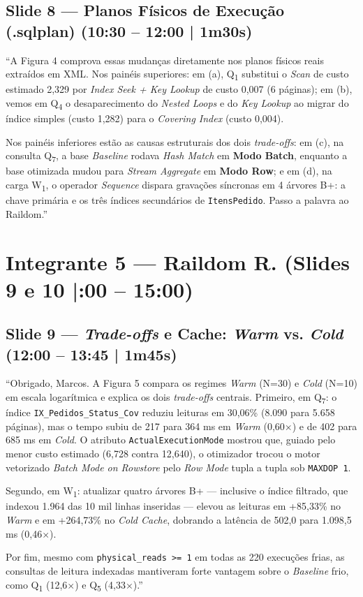 \documentclass[10pt,a4paper]{article}
\begin{document}
\subsection{Slide 8 — Planos Físicos de Execução (.sqlplan) (10:30 – 12:00 | 1m30s)}
\begin{fala}
``A Figura 4 comprova essas mudanças diretamente nos planos físicos reais extraídos em XML. Nos painéis superiores: em (a), Q\textsubscript{1} substitui o \textit{Scan} de custo estimado 2,329 por \textit{Index Seek + Key Lookup} de custo 0,007 (6 páginas); em (b), vemos em Q\textsubscript{4} o desaparecimento do \textit{Nested Loops} e do \textit{Key Lookup} ao migrar do índice simples (custo 1,282) para o \textit{Covering Index} (custo 0,004).

Nos painéis inferiores estão as causas estruturais dos dois \textit{trade-offs}: em (c), na consulta Q\textsubscript{7}, a base \textit{Baseline} rodava \textit{Hash Match} em \textbf{Modo Batch}, enquanto a base otimizada mudou para \textit{Stream Aggregate} em \textbf{Modo Row}; e em (d), na carga W\textsubscript{1}, o operador \textit{Sequence} dispara gravações síncronas em 4 árvores B+: a chave primária e os três índices secundários de \texttt{ItensPedido}. Passo a palavra ao Raildom.''
\end{fala}

\section{Integrante 5 — Raildom R. (Slides 9 e 10 \enspace|:00 – 15:00)}

\subsection{Slide 9 — \textit{Trade-offs} e Cache: \textit{Warm} vs. \textit{Cold} (12:00 – 13:45 | 1m45s)}
\begin{fala}
``Obrigado, Marcos. A Figura 5 compara os regimes \textit{Warm} (N=30) e \textit{Cold} (N=10) em escala logarítmica e explica os dois \textit{trade-offs} centrais. Primeiro, em Q\textsubscript{7}: o índice \texttt{IX\_Pedidos\_Status\_Cov} reduziu leituras em 30,06\% (8.090 para 5.658 páginas), mas o tempo subiu de 217 para 364 ms em \textit{Warm} (0,60$\times$) e de 402 para 685 ms em \textit{Cold}. O atributo \texttt{ActualExecutionMode} mostrou que, guiado pelo menor custo estimado (6,728 contra 12,640), o otimizador trocou o motor vetorizado \textit{Batch Mode on Rowstore} pelo \textit{Row Mode} tupla a tupla sob \texttt{MAXDOP 1}.

Segundo, em W\textsubscript{1}: atualizar quatro árvores B+ — inclusive o índice filtrado, que indexou 1.964 das 10 mil linhas inseridas — elevou as leituras em +85,33\% no \textit{Warm} e em +264,73\% no \textit{Cold Cache}, dobrando a latência de 502,0 para 1.098,5 ms (0,46$\times$).

Por fim, mesmo com \texttt{physical\_reads >= 1} em todas as 220 execuções frias, as consultas de leitura indexadas mantiveram forte vantagem sobre o \textit{Baseline} frio, como Q\textsubscript{1} (12,6$\times$) e Q\textsubscript{5} (4,33$\times$).''
\end{fala}
\end{document}
